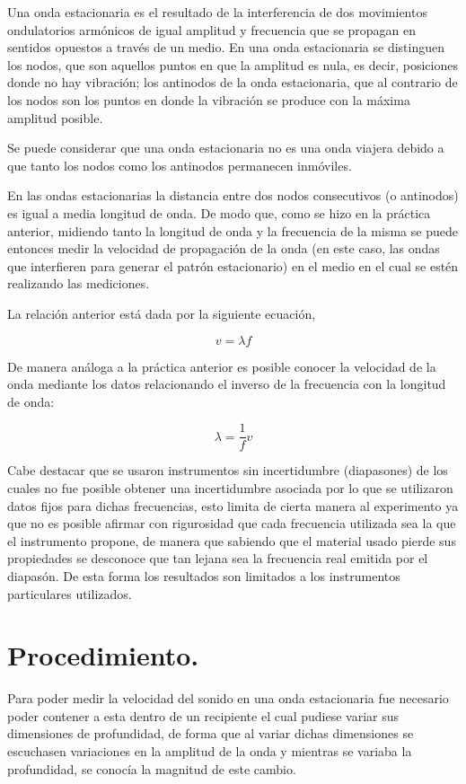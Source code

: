 \documentclass[10pt,a4paper]{article}
\begin{document}
Una onda estacionaria es el resultado de la interferencia de dos movimientos ondulatorios armónicos de igual amplitud y frecuencia que se propagan en sentidos opuestos a través de un medio. En una onda estacionaria se distinguen los nodos, que son aquellos puntos en que la amplitud es nula, es decir, posiciones donde no hay vibración; los antinodos de la onda estacionaria, que al contrario de los nodos son los puntos en donde la vibración se produce con la máxima amplitud posible.

Se puede considerar que una onda estacionaria no es una onda viajera debido a que tanto los nodos como los antinodos permanecen inmóviles. 

En las ondas estacionarias la distancia entre dos nodos consecutivos (o antinodos) es igual a media longitud de onda. De modo que, como se hizo en la práctica anterior, midiendo tanto la longitud de onda y la frecuencia de la misma se puede entonces medir la velocidad de propagación de la onda (en este caso, las ondas que interfieren para generar el patrón estacionario) en el medio en el cual se estén realizando las mediciones. 

La relación anterior está dada por la siguiente ecuación, 

\begin{equation}
	v = \lambda f
\end{equation}

De manera análoga a la práctica anterior es posible conocer la velocidad de la onda mediante los datos relacionando el inverso de la frecuencia con la longitud de onda:

\begin{equation}
    \lambda = \frac{1}{f}v
\end{equation}

Cabe destacar que se usaron instrumentos sin incertidumbre (diapasones) de los cuales no fue posible obtener una incertidumbre asociada por lo que se utilizaron datos fijos para dichas frecuencias, esto limita de cierta manera al experimento ya que no es posible afirmar con rigurosidad que cada frecuencia utilizada sea la que el instrumento propone, de manera que sabiendo que el material usado pierde sus propiedades se desconoce que tan lejana sea la frecuencia real emitida por el diapasón. De esta forma los resultados son limitados a los instrumentos particulares utilizados.

\newpage
\section{Procedimiento.}
Para poder medir la velocidad del sonido en una onda estacionaria fue necesario poder contener a esta dentro de un recipiente el cual pudiese variar sus dimensiones de profundidad, de forma que al variar dichas dimensiones se escuchasen variaciones en la amplitud de la onda y mientras se variaba la profundidad, se conocía la magnitud de este cambio.
\end{document}
